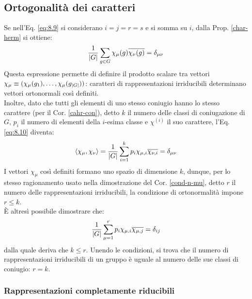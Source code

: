 \subsection{Ortogonalità dei caratteri}

Se nell'Eq. \ref{eq:8.9} si considerano $ i = j = r = s $ e si somma su $ i $, dalla Prop. \ref{char-herm} si ottiene:
\begin{equation}
	\frac{1}{\left\lvert G\right\rvert} \sum_{g \in G} \chi_{\mu}(g) \overline{\chi_{\nu}(g)} = \delta_{\mu \nu}
	\label{eq:8.10}
\end{equation}
Questa espressione permette di definire il prodotto scalare tra vettori $ \chi_{\mu} \equiv (\chi_{\mu}(g_1), \dots, \chi_{\mu}(g_{\left\lvert G\right\rvert})) $: caratteri di rappresentazioni irriducibili determinano vettori ortonormali così definiti.\\
Inoltre, dato che tutti gli elementi di uno stesso coniugio hanno lo stesso carattere (per il Cor. \ref{cahr-con}), detto $ k $ il numero delle classi di coniugazione di $ G $, $ p_i $ il numero di elementi della $ i $-esima classe e $ \chi^{(i)} $ il suo carattere, l'Eq. \ref{eq:8.10} diventa:
\begin{equation}
	\braket{\chi_{\mu},\chi_{\nu}} = \frac{1}{\left\lvert G\right\rvert} \sum_{i = 1}^{k} p_i \chi_{\mu,i} \overline{\chi_{\nu,i}} = \delta_{\mu \nu}
	\label{eq:8.11}
\end{equation}
I vettori $ \chi_{\mu} $ così definiti formano uno spazio di dimensione $ k $, dunque, per lo stesso ragionamento usato nella dimostrazione del Cor. \ref{cond-n-mu}, detto $ r $ il numero delle rappresentazioni irriducibili, la condizione di ortonormalità impone $ r \le k $.\\
È altresì possibile dimostrare che:
\begin{equation}
	\frac{1}{\left\lvert G\right\rvert} \sum_{\mu = 1}^{r} p_i \chi_{\mu,i} \overline{\chi_{\mu,j}} = \delta_{ij}
	\label{eq:8.12}
\end{equation}
dalla quale deriva che $ k \le r $. Unendo le condizioni, si trova che il numero di rappresentazioni irriducibili di un gruppo è uguale al numero delle sue classi di coniugio: $ r = k $.

\subsubsection{Rappresentazioni completamente riducibili}

